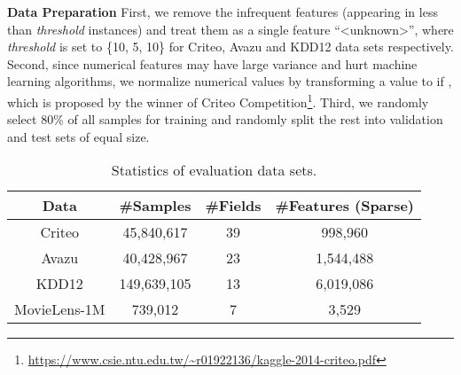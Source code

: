 \noindent\textbf{Data Preparation} First, we remove the infrequent features (appearing in less than \textit{threshold} instances) and treat them as a single feature ``<unknown>'', where \textit{threshold} is set to \{10, 5, 10\} for Criteo, Avazu and KDD12 data sets respectively.
Second, since numerical features may have large variance and hurt machine learning algorithms, we normalize numerical values by transforming a value  to  if , which is proposed by the winner of Criteo Competition\footnote{\url{https://www.csie.ntu.edu.tw/~r01922136/kaggle-2014-criteo.pdf}}. Third, we randomly select 80\% of all samples for training and randomly split the rest into validation and test sets of equal size.

\begin{table}
\centering\caption{Statistics of evaluation data sets.}
\begin{tabular}{cccc} 
\toprule
Data & \#Samples & \#Fields & \#Features (Sparse)  \\
\midrule
Criteo & 45,840,617 & 39 & 998,960 \\
Avazu & 40,428,967 & 23 & 1,544,488 \\
KDD12 & 149,639,105 & 13 & 6,019,086\\
MovieLens-1M & 739,012 & 7 & 3,529 \\
\bottomrule
\end{tabular}\label{tab::dataset}
\end{table}




